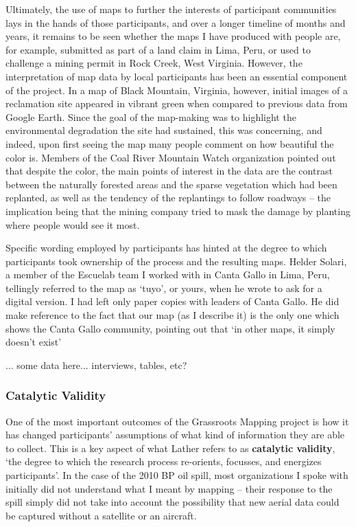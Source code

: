 \documentclass[11pt]{report}
\begin{document}
Ultimately, the use of maps to further the interests of participant communities lays in the hands of those participants, and over a longer timeline of months and years, it remains to be seen whether the maps I have produced with people are, for example, submitted as part of a land claim in Lima, Peru, or used to challenge a mining permit in Rock Creek, West Virginia. However, the interpretation of map data by local participants has been an essential component of the project. In a map of Black Mountain, Virginia, however, initial images of a reclamation site appeared in vibrant green when compared to previous data from Google Earth. Since the goal of the map-making was to highlight the environmental degradation the site had sustained, this was concerning, and indeed, upon first seeing the map many people comment on how beautiful the color is. Members of the Coal River Mountain Watch organization pointed out that despite the color, the main points of interest in the data are the contrast between the naturally forested areas and the sparse vegetation which had been replanted, as well as the tendency of the replantings to follow roadways -- the implication being that the mining company tried to mask the damage by planting where people would see it most.  

Specific wording employed by participants has hinted at the degree to which participants took ownership of the process and the resulting maps. Helder Solari, a member of the Escuelab team I worked with in Canta Gallo in Lima, Peru, tellingly referred to the map as `tuyo', or yours, when he wrote to ask for a digital version. I had left only paper copies with leaders of Canta Gallo. He did make reference to the fact that our map (as I describe it) is the only one which shows the Canta Gallo community, pointing out that `in other maps, it simply doesn't exist' \cite{solari2010cantagallo}

... some data here... interviews, tables, etc?

\subsubsection{Catalytic Validity}

One of the most important outcomes of the Grassroots Mapping project is how it has changed participants' assumptions of what kind of information they are able to collect. This is a key aspect of what Lather refers to as \textbf{catalytic validity}, `the degree to which the research process re-orients, focusses, and energizes participants'. In the case of the 2010 BP oil spill, most organizations I spoke with initially did not understand what I meant by mapping -- their response to the spill simply did not take into account the possibility that new aerial data could be captured without a satellite or an aircraft. 
\end{document}
